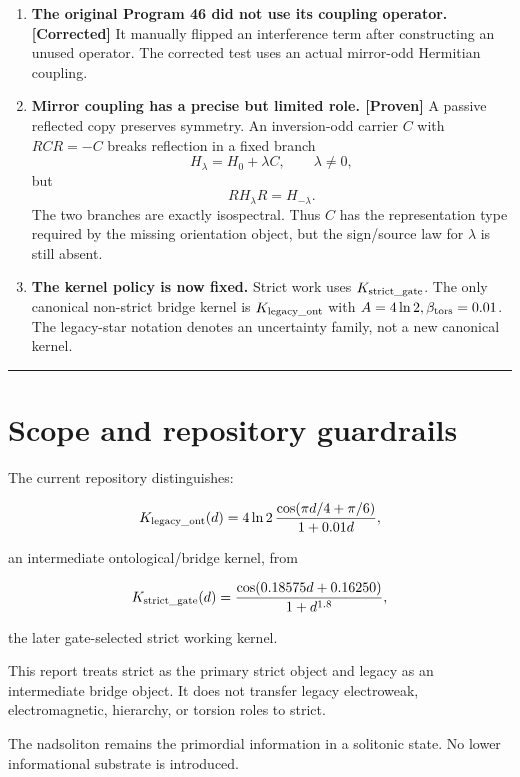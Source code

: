 \documentclass[11pt,a4paper,openany]{report}
\newcommand{\statusProven}{\textcolor{fingreen}{[Proven]}}
\begin{document}
\begin{enumerate}
\item 
\textbf{The original Program 46 did not use its coupling operator. [Corrected]} It manually flipped an interference term after constructing an unused operator. The corrected test uses an actual mirror-odd Hermitian coupling.

\item 
\textbf{Mirror coupling has a precise but limited role. \statusProven{}} A passive reflected copy preserves symmetry. An inversion-odd carrier \(C\) with \(RCR=-C\) breaks reflection in a fixed branch \[
   H_\lambda=H_0+\lambda C,\qquad \lambda\ne0,
   \] but \[
   RH_\lambda R=H_{-\lambda}.
   \] The two branches are exactly isospectral. Thus \(C\) has the representation type required by the missing orientation object, but the sign/\allowbreak{}source law for \(\lambda\) is still absent.

\item 
\textbf{The kernel policy is now fixed.} Strict work uses \(K_{\rm strict\_gate}\). The only canonical non-strict bridge kernel is \(K_{\rm legacy\_ont}\) with \(A=4\ln2,\beta_{\rm tors}=0.01\). The legacy-star notation denotes an uncertainty family, not a new canonical kernel.

\end{enumerate}

\par\medskip\hrule\medskip

\chapter{Scope and repository guardrails}

The current repository distinguishes:

\[
K_{\rm legacy\_ont}(d)
=
4\ln2\,
\frac{\cos(\pi d/4+\pi/6)}{1+0.01d},
\]

an intermediate ontological/\allowbreak{}bridge kernel, from

\[
K_{\rm strict\_gate}(d)
=
\frac{\cos(0.18575d+0.16250)}{1+d^{1.8}},
\]

the later gate-selected strict working kernel.

This report treats strict as the primary strict object and legacy as an intermediate bridge object. It does not transfer legacy electroweak, electromagnetic, hierarchy, or torsion roles to strict.

The nadsoliton remains the primordial information in a solitonic state. No lower informational substrate is introduced.
\end{document}
